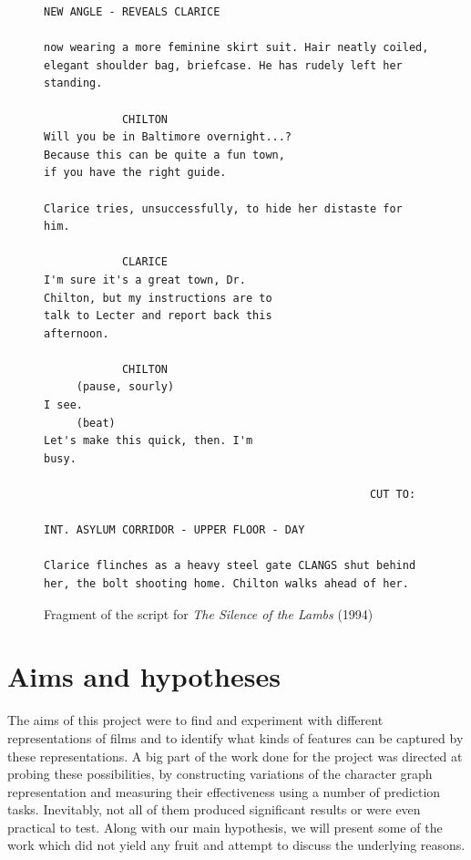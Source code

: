 \documentclass[bsc,frontabs,deptreport,singlespacing,parskip, twoside]{infthesis}
\begin{document}
\begin{figure}[h!]
\centering
\begin{minipage}{13.2cm}
\begin{Verbatim}[frame=single]
NEW ANGLE - REVEALS CLARICE

now wearing a more feminine skirt suit. Hair neatly coiled, 
elegant shoulder bag, briefcase. He has rudely left her 
standing.

            CHILTON
Will you be in Baltimore overnight...? 
Because this can be quite a fun town, 
if you have the right guide.

Clarice tries, unsuccessfully, to hide her distaste for him.

            CLARICE
I'm sure it's a great town, Dr. 
Chilton, but my instructions are to 
talk to Lecter and report back this 
afternoon.

            CHILTON
     (pause, sourly)
I see.
     (beat)
Let's make this quick, then. I'm 
busy.

                                                  CUT TO:

INT. ASYLUM CORRIDOR - UPPER FLOOR - DAY

Clarice flinches as a heavy steel gate CLANGS shut behind 
her, the bolt shooting home. Chilton walks ahead of her.
\end{Verbatim}
\end{minipage}
\caption{Fragment of the script for \textit{The Silence of the Lambs} (1994)}
\label{fig:lambs_script}
\end{figure}



\chapter{Aims and hypotheses}
\label{chap:aims}

The aims of this project were to find and experiment with different representations of films and to identify what kinds of features can be captured by these representations. A big part of the work done for the project was directed at probing these possibilities, by constructing variations of the character graph representation and measuring their effectiveness using a number of prediction tasks. Inevitably, not all of them produced significant results or were even practical to test. Along with our main hypothesis, we will present some of the work which did not yield any fruit and attempt to discuss the underlying reasons.
\end{document}

